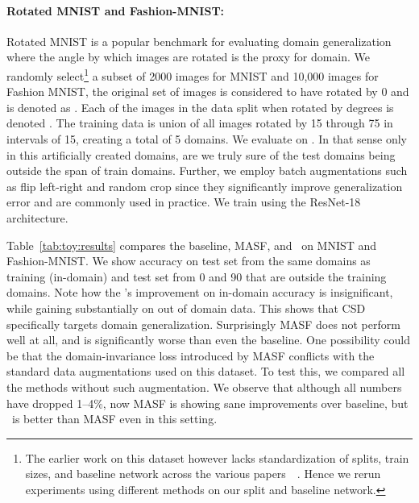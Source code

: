 \documentclass{article}
\begin{document}
\paragraph{Rotated MNIST and Fashion-MNIST:}
\label{sec:expt:rotation}
Rotated MNIST is a popular benchmark for evaluating domain generalization where the angle by which images are rotated is the proxy for domain.
We randomly select\footnote{ The earlier work on this dataset however lacks standardization of splits, train sizes, and baseline network across the various papers~\cite{VihariSSS18}~\cite{WangZZ2019}. Hence we rerun experiments using different methods on our split and baseline network.
} 
a subset of 2000 images for MNIST and 10,000 images for Fashion MNIST, the original set of images is considered to have rotated by 0{\degree} and is denoted as . Each of the images in the data split when  rotated by  degrees is denoted . The training data is union of all images rotated by 15{\degree} through 75{\degree} in intervals of 15{\degree}, creating a total of 5 domains.  We evaluate on .  In that sense only in this artificially created domains, are we truly sure of the test domains being outside the span of train domains.
Further, we employ batch augmentations such as flip left-right and random crop since they significantly improve generalization error and are commonly used in practice. We train using the ResNet-18 architecture.  

Table~\ref{tab:toy:results} compares the baseline, MASF, and \mos\ on MNIST and Fashion-MNIST. We show accuracy on test set from the same domains as training (in-domain) and test set from 0{\degree} and 90{\degree} that are outside the training domains. 
Note how the \mos's improvement on in-domain accuracy is insignificant, while gaining substantially on out of domain data.  This shows that CSD specifically targets domain generalization.  Surprisingly MASF does not perform well at all, and is significantly worse than even the baseline.  One possibility could be that the domain-invariance loss introduced by MASF conflicts with the standard data augmentations used on this dataset. To test this, we compared all the methods without such augmentation.  We observe that although all numbers have dropped 1--4\%, now MASF is showing sane improvements over baseline, but \mos\ is better than MASF even in this setting.  
\end{document}
